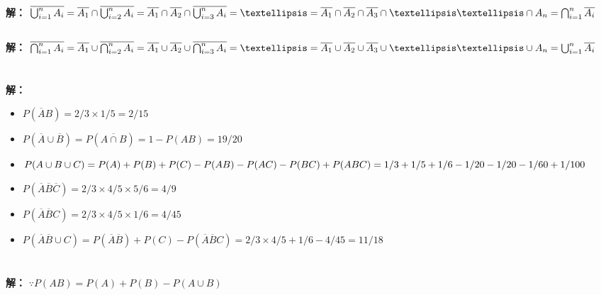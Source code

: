 \documentclass[12pt,a4paper]{ctexart}
\begin{document}
\section{}
\subsection{}
\textbf{解： }
$\overline{\bigcup_{i=1}^n A_i}=
	\overline{A_1}\cap \overline{\bigcup_{i=2}^n A_i}\\
	=\overline{A_1}\cap \overline{A_2}\cap \overline{\bigcup_{i=3}^n A_i}\\
	=…\\
	=\overline{A_1}\cap \overline{A_2}\cap \overline{A_3}\cap……\cap\overline\\{A_n}\\
	=\bigcap_{i=1}^n \overline{A_i}$
\subsection{}
\textbf{解： }
$\overline{\bigcap_{i=1}^n A_i}=
	\overline{A_1}\cup \overline{\bigcap_{i=2}^n A_i}\\
	=\overline{A_1}\cup \overline{A_2}\cup \overline{\bigcap_{i=3}^n A_i}\\
	=…\\
	=\overline{A_1}\cup \overline{A_2}\cup \overline{A_3}\cup……\cup\overline\\{A_n}\\
	=\bigcup_{i=1}^n \overline{A_i}$
\section{}
\textbf{解： }
\begin{itemize}
	\item $P(\overline{A}B)=2/3\times 1/5=2/15$
	\item $P(\overline{A}\cup\overline{B})=P(\overline{A\cap B})=1-P(AB)=19/20$
	\item $P(A\cup B\cup C)=P(A)+P(B)+P(C)-P(AB)-P(AC)-P(BC)+P(ABC)\\=1/3+1/5+1/6-1/20-1/20-1/60+1/100$
	\item $P(\overline{A}\overline{B}\overline{C})=2/3\times 4/5\times 5/6=4/9$
	\item $P(\overline{A}\overline{B}C)=2/3\times 4/5\times 1/6=4/45$
	\item $P(\overline{A}\overline{B}\cup C)=P(\overline{A}\overline{B})+P(C)-P(\overline{A}\overline{B}C)=2/3\times 4/5+1/6-4/45=11/18$
\end{itemize}
\section{}
\textbf{解： }$\because P(AB)=P(A)+P(B)-P(A\cup B)$
\end{document}
